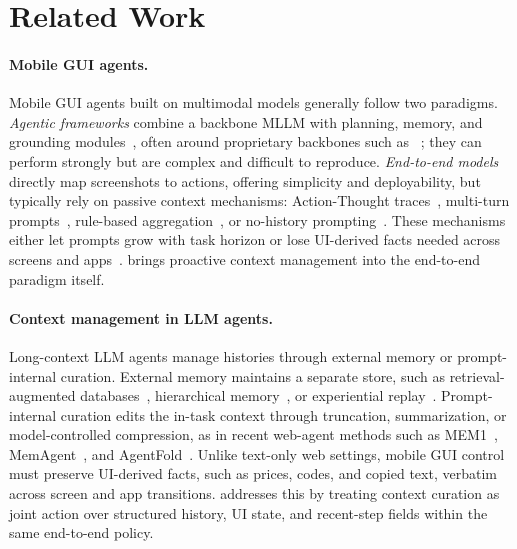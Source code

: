 \section{Related Work}
\label{sec:related-work}
\vspace{-0.25em}

\paragraph{Mobile GUI agents.}
Mobile GUI agents built on multimodal models generally follow two paradigms. 
\emph{Agentic frameworks} combine a backbone MLLM with planning, memory, and grounding modules~\cite{rawles2025androidworld,wang2024mobile,wang2025mobileagentselfevolving,agashe2025agent}, often around proprietary backbones such as ~\cite{comanici2025gemini}; they can perform strongly but are complex and difficult to reproduce. 
\emph{End-to-end models}~\cite{gao2026ui,zhou2025mai,hong2024cogagent,xu2026mobile} directly map screenshots to actions, offering simplicity and deployability, but typically rely on passive context mechanisms: Action-Thought traces~\cite{zhang2025appagent,gu2025ui-venus,xu2026mobile,bai2025qwen3}, multi-turn prompts~\cite{qin2025ui}, rule-based aggregation~\cite{zheng2024seeact}, or no-history prompting~\cite{hong2024cogagent}. 
These mechanisms either let prompts grow with task horizon or lose UI-derived facts needed across screens and apps~\cite{liu2026memgui,kong2025mobileworld}. 
\ourmethod brings proactive context management into the end-to-end paradigm itself.

\paragraph{Context management in LLM agents.}
Long-context LLM agents manage histories through external memory or prompt-internal curation. 
External memory maintains a separate store, such as retrieval-augmented databases~\cite{lewis2020retrieval,chhikara2025mem0,xu2026mem}, hierarchical memory~\cite{zhang2026g}, or experiential replay~\cite{zhao2024expel}. 
Prompt-internal curation edits the in-task context through truncation, summarization, or model-controlled compression, as in recent web-agent methods such as MEM1~\cite{zhou2025mem1}, MemAgent~\cite{yu2025memagent}, and AgentFold~\cite{ye2025agentfold}. 
Unlike text-only web settings, mobile GUI control must preserve UI-derived facts, such as prices, codes, and copied text, verbatim across screen and app transitions. 
\conact addresses this by treating context curation as joint action over structured history, UI state, and recent-step fields within the same end-to-end policy.